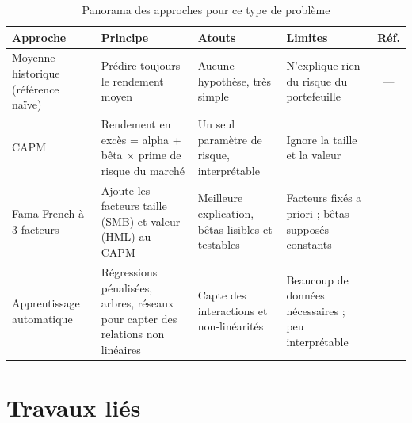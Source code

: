 \documentclass[11pt,a4paper]{article}
\begin{document}
\begin{table}[H]
\centering
\caption{Panorama des approches pour ce type de problème}
\small
\begin{tabularx}{\textwidth}{|p{2.6cm}|X|X|X|c|}
\hline
\textbf{Approche} & \textbf{Principe} & \textbf{Atouts} & \textbf{Limites} & \textbf{Réf.}\\\hline
Moyenne historique (référence naïve) & Prédire toujours le rendement moyen & Aucune hypothèse, très simple & N'explique rien du risque du portefeuille & ---\\\hline
CAPM & Rendement en excès = alpha + bêta $\times$ prime de risque du marché & Un seul paramètre de risque, interprétable & Ignore la taille et la valeur & \cite{sharpe}\\\hline
Fama-French à 3 facteurs & Ajoute les facteurs taille (SMB) et valeur (HML) au CAPM & Meilleure explication, bêtas lisibles et testables & Facteurs fixés a priori ; bêtas supposés constants & \cite{ff93}\\\hline
Apprentissage automatique & Régressions pénalisées, arbres, réseaux pour capter des relations non linéaires & Capte des interactions et non-linéarités & Beaucoup de données nécessaires ; peu interprétable & \cite{gku}\\\hline
\end{tabularx}
\end{table}

\section{Travaux liés}
\end{document}
